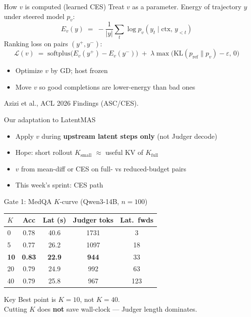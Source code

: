 \documentclass{beamer}
\begin{document}
\begin{frame}{How $v$ is computed (learned CES)}
    Treat $v$ as a parameter. Energy of trajectory $y$ under steered model $p_v$:
    \[
      E_v(y) \;=\; -\frac{1}{|y|}\sum_t \log p_v(y_t\mid \mathrm{ctx},\, y_{<t})
    \]
    Ranking loss on pairs $(y^{+}, y^{-})$:
    \[
      \mathcal{L}(v) \;=\; \mathrm{softplus}\!\big(E_v(y^{+})-E_v(y^{-})\big)
      \;+\; \lambda\max\!\big(\mathrm{KL}(p_{\mathrm{ref}}\|p_v)-\varepsilon,\,0\big)
    \]
    \begin{itemize}
        \item Optimize $v$ by GD; host frozen
        \item Move $v$ so good completions are lower-energy than bad ones
    \end{itemize}
    \vspace{0.15cm}
    {\footnotesize Azizi et al., ACL 2026 Findings (ASC/CES).}
\end{frame}

\begin{frame}{Our adaptation to LatentMAS}
    \begin{itemize}
        \item Apply $v$ during \textbf{upstream latent steps only} (not Judger decode)
        \item Hope: short rollout $K_{\mathrm{small}}$ $\approx$ useful KV of $K_{\mathrm{full}}$
        \item $v$ from mean-diff or CES on full- vs reduced-budget pairs
        \item This week's sprint: CES path
    \end{itemize}
\end{frame}

\begin{frame}{Gate 1: MedQA $K$-curve (Qwen3-14B, $n{=}100$)}
    \small
    \begin{center}
    \begin{tabular}{lcccc}
    \toprule
    $K$ & Acc & Lat (s) & Judger toks & Lat.\ fwds \\
    \midrule
    0  & 0.78 & 40.6 & 1731 & 3 \\
    5  & 0.77 & 26.2 & 1097 & 18 \\
    \textbf{10} & \textbf{0.83} & \textbf{22.9} & \textbf{944} & 33 \\
    20 & 0.79 & 24.9 & 992 & 63 \\
    40 & 0.79 & 25.8 & 967 & 123 \\
    \bottomrule
    \end{tabular}
    \end{center}
    \normalsize
    \vspace{0.2cm}
    \begin{alertblock}{Key}
        Best point is $K{=}10$, not $K{=}40$.\\
        Cutting $K$ does \textbf{not} save wall-clock --- Judger length dominates.
    \end{alertblock}
\end{frame}
\end{document}
